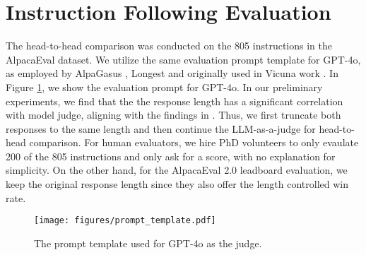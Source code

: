 \section{Instruction Following Evaluation}\label{app: comparison}
The head-to-head comparison was conducted on the 805 instructions in the AlpacaEval dataset.
We utilize the same evaluation prompt template for GPT-4o, as employed by AlpaGasus \citep{chenalpagasus}, Longest \citep{zhaolong} and originally used in Vicuna work \citep{chiang2023vicuna}
. In Figure \ref{fig: evaluation_prompt}, we show the evaluation prompt for GPT-4o. In our preliminary experiments, we find that the the response length has a significant correlation with model judge, aligning with the findings in \citep{dubois2024length}. Thus, we first truncate both responses to the same length and then continue the LLM-as-a-judge for head-to-head comparison. For human evaluators, we hire PhD volunteers to only evaulate 200 of the 805 instructions and only ask for a score, with no explanation for simplicity. On the other hand, for the AlpacaEval 2.0 leadboard evaluation, we keep the original response length since they also offer the length controlled win rate.

\begin{figure}[h]
\centering
\texttt{[image: figures/prompt\_template.pdf]}
\caption{The prompt template used for GPT-4o as the judge.}\label{fig: evaluation_prompt}
\end{figure} 